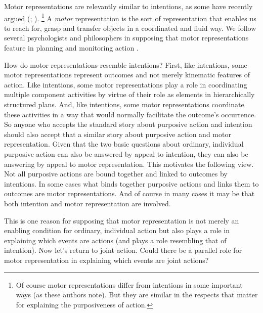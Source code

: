 \documentclass[12pt,\papersize]{extarticle}
\begin{document}
Motor representations are relevantly similar to intentions,
as some have recently argued (\citealp[pp.\ 189-90]{pacherie:2008_action}; \citealp{butterfill:2012_intention}).%
\footnote{
Of course motor representations differ from intentions in some important ways (as these authors note).
But they are similar in the respects that matter for explaining the purposiveness of action.
}
A \textit{motor} representation is the sort of representation that enables us to reach for, grasp and transfer objects in a coordinated and fluid way.
We follow several psychologists and philosophers in supposing that motor representations feature in planning and monitoring action \citep[e.g.]{wolpert:1995internal, miall:1996_forward}.

How do motor representations resemble intentions?
First, like intentions, some motor representations represent outcomes and not merely kinematic features of action.
Like intentions, some motor representations play a role in coordinating multiple  component activities by virtue of their role as elements in hierarchically structured plans.
And, like intentions, some motor representations coordinate these activities in a way that would normally facilitate the outcome’s occurrence.
So anyone who accepts the standard story about purposive action and intention
should also accept that a similar story about purposive action and motor representation.
Given that the two basic questions about ordinary, individual purposive action can also be answered by appeal to intention,
they can also be answering by appeal to motor representation.
This motivates the following view.
Not all purposive actions are bound together and linked to outcomes by intentions. 
In some cases what binds together purposive actions and links them to outcomes are motor representations.
And of course in many cases it may be that both intention and motor representation are involved.

This is one reason for supposing that motor representation is not merely an enabling condition for ordinary, individual action but also plays a role in explaining which events are actions (and plays a role resembling that of intention).
Now let's return to joint action.
Could there be a parallel role for motor representation in explaining which events are joint actions? 
\end{document}
